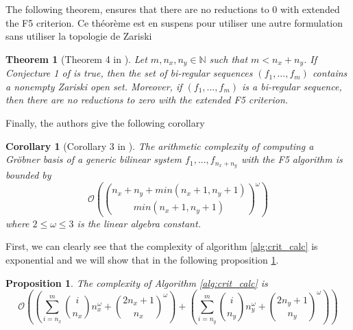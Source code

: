 \documentclass[english]{article}
\newtheorem{proposition}{Proposition}[section]
\newtheorem{theorem}{Theorem}[section]
\newtheorem{corollary}{Corollary}[section]
\begin{document}
		 The following theorem, ensures that there are no reductions to 0 with extended the F5 criterion. Ce théorème est en suspens pour utiliser une autre formulation sans utiliser la topologie de Zariski
		 
		 \begin{theorem}[Theorem 4 in \cite{FSS11}]
		 	Let $m, n_x, n_y \in \mathbb{N}$ such that $m < n_x + n_y$. If Conjecture 1 of \cite{FSS11} is true, then the set of bi-regular sequences $(f_1,...,f_m)$ contains a nonempty Zariski open set. Moreover, if $(f_1,...,f_m)$ is a bi-regular sequence, then there are no reductions to zero with the extended F5 criterion.
		 \end{theorem}
		 
		 Finally, the authors give the following corollary 
		 
		 \begin{corollary}[Corollary 3 in \cite{FSS11}]
		 The arithmetic complexity of computing a Gröbner basis of a generic bilinear system $f_1,...,f_{n_x + n_y}$ with the F5 algorithm is bounded by
		 $$\mathcal{O}\left(\binom{n_x + n_y + min(n_x + 1, n_y + 1)}{min(n_x + 1, n_y + 1)}^\omega\right)$$
		 where $2 \leq \omega \leq 3$ is the linear algebra constant.
		 \end{corollary}
		 
		 First, we can clearly see that the complexity of algorithm \ref{alg:crit_calc} is exponential and we will show that in the following proposition \ref{complexCrit}.
		 
		 \begin{proposition}\label{complexCrit}
		 	The complexity of Algorithm \ref{alg:crit_calc} is
		 	$$
		 	\mathcal{O}\left(\left(\sum_{i = n_x}^{m} \binom{i}{n_x}n_x^{\omega} + \binom{2n_x + 1}{n_x}^\omega\right) + \left(\sum_{i = n_y}^{m} \binom{i}{n_y}n_y^{\omega} + \binom{2n_y + 1}{n_y}^\omega\right)\right)
		 	$$
		 \end{proposition}
		 
\end{document}
